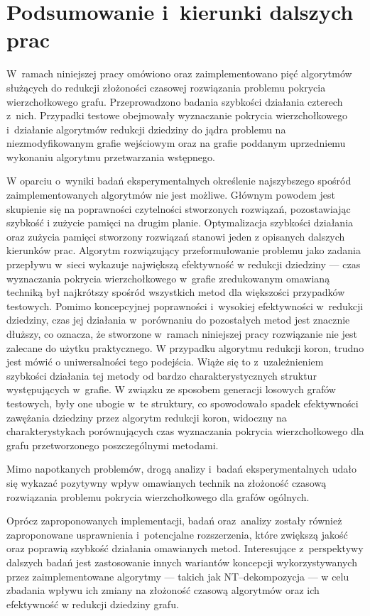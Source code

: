 \chapter{Podsumowanie i~kierunki dalszych prac}
\label{summary}
  W~ramach niniejszej pracy omówiono oraz zaimplementowano pięć algorytmów służących do redukcji złożoności czasowej rozwiązania problemu pokrycia wierzchołkowego grafu. Przeprowadzono badania szybkości działania czterech z~nich.
  Przypadki testowe obejmowały wyznaczanie pokrycia wierzchołkowego i~działanie algorytmów redukcji dziedziny do jądra problemu na niezmodyfikowanym grafie wejściowym oraz na grafie poddanym uprzedniemu wykonaniu algorytmu przetwarzania wstępnego.

  W oparciu o~wyniki badań eksperymentalnych określenie najszybszego spośród zaimplementowanych algorytmów nie jest możliwe.
  Głównym powodem jest skupienie się na poprawności czytelności stworzonych rozwiązań, pozostawiając szybkość i zużycie pamięci na drugim planie.
  Optymalizacja szybkości działania oraz zużycia pamięci stworzony rozwiązań stanowi jeden z opisanych dalszych kierunków prac.
  Algorytm rozwiązujący przeformułowanie problemu jako zadania przepływu w~sieci wykazuje największą efektywność w redukcji dziedziny --- czas wyznaczania pokrycia wierzchołkowego w~grafie zredukowanym omawianą techniką był najkrótszy spośród wszystkich metod dla większości przypadków testowych.
  Pomimo koncepcyjnej poprawności i~wysokiej efektywności w~redukcji dziedziny, czas jej działania w~porównaniu do pozostałych metod jest znacznie dłuższy, co oznacza, że stworzone w~ramach niniejszej pracy rozwiązanie nie jest zalecane do użytku praktycznego.
  W przypadku algorytmu redukcji koron, trudno jest mówić o uniwersalności tego podejścia.
  Wiąże się to z~uzależnieniem szybkości działania tej metody od bardzo charakterystycznych struktur występujących w~grafie.
  W związku ze sposobem generacji losowych grafów testowych, były one ubogie w~te struktury, co spowodowało spadek efektywności zawężania dziedziny przez algorytm redukcji koron, widoczny na charakterystykach porównujących czas wyznaczania pokrycia wierzchołkowego dla grafu przetworzonego poszczególnymi metodami.

  Mimo napotkanych problemów, drogą analizy i~badań eksperymentalnych udało się wykazać pozytywny wpływ omawianych technik na złożoność czasową rozwiązania problemu pokrycia wierzchołkowego dla grafów ogólnych.

  Oprócz zaproponowanych implementacji, badań oraz~analizy zostały również zaproponowane usprawnienia i~potencjalne rozszerzenia, które zwiększą jakość oraz poprawią szybkość działania omawianych metod.
  Interesujące z~perspektywy dalszych badań jest zastosowanie innych wariantów koncepcji wykorzystywanych przez zaimplementowane algorytmy --- takich jak NT--dekompozycja --- w celu zbadania wpływu ich zmiany na złożoność czasową algorytmów oraz ich efektywność w redukcji dziedziny grafu.

